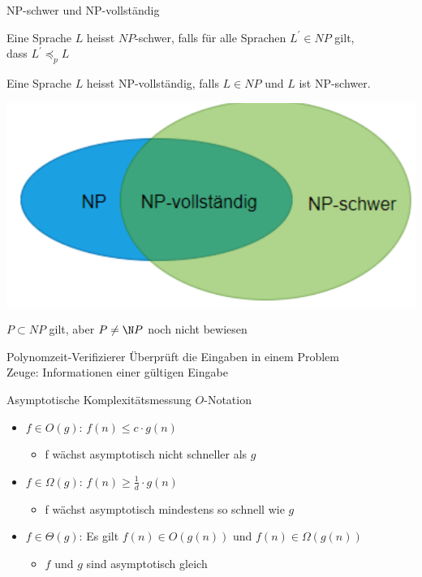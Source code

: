 \begin{concept}{NP-schwer und NP-vollständig}\\
    \begin{minipage}{0.6\linewidth}
        Eine Sprache $L$ heisst $N P$-schwer, falls für alle Sprachen $L^{\prime} \in N P$ gilt, \\dass $L^{\prime} \preccurlyeq_{p} L$
        
        Eine Sprache $L$ heisst NP-vollständig, falls $L \in N P$ und $L$ ist NP-schwer.
    \end{minipage}
    \begin{minipage}{0.38\linewidth}
        \includegraphics[width=1\linewidth]{images/p_vs_np.png}
    \end{minipage}
\end{concept}

\begin{remark}
    $P \subset N P $ gilt, aber $P \neq \N P$ noch nicht bewiesen
\end{remark}

\begin{definition}{Polynomzeit-Verifizierer}
    Überprüft die Eingaben in einem Problem\\
    Zeuge: Informationen einer gültigen Eingabe
\end{definition}

\begin{KR}{Asymptotische Komplexitätsmessung}
    $O$-Notation
    \begin{itemize}
        \item $f \in O(g)$: $f(n) \leq c \cdot g(n)$
        \begin{itemize}
            \item f wächst asymptotisch nicht schneller als $g$
        \end{itemize}
        \item $f \in \Omega(g)$: $f(n) \geq \frac{1}{d} \cdot g(n)$
        \begin{itemize}
            \item f wächst asymptotisch mindestens so schnell wie $g$
        \end{itemize}
        \item $f \in \Theta(g)$: Es gilt $f(n) \in O(g(n))$ und $f(n) \in \Omega(g(n))$
        \begin{itemize}
            \item $f$ und $g$ sind asymptotisch gleich
        \end{itemize}
    \end{itemize}
\end{KR}

